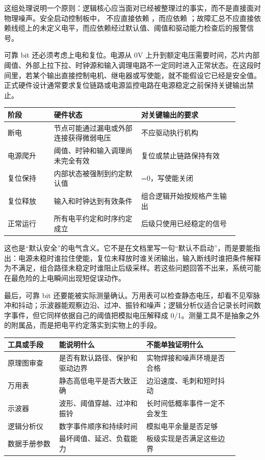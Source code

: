 这组处理说明一个原则：逻辑核心应当面对已经被整理过的事实，而不是直接面对物理噪声。安全启动控制板中， 不应直接依赖 ，而应依赖 ；故障汇总不应直接依赖线缆上的未定义电平，而应依赖经过默认值、阈值和驱动能力检查后的报警信号。

可靠 bit 还必须考虑上电和复位。电源从 0V 上升到额定电压需要时间，芯片内部阈值、外部上拉下拉、时钟源和输入调理电路不一定同时进入正常状态。在这段时间里，若某个输出直接控制电机、继电器或写使能，就不能假设它已经是安全值。正式硬件设计通常要求复位链路或电源监控电路在电源稳定之前保持关键输出禁止。

\begin{longtable}{L{0.18\linewidth}L{0.34\linewidth}L{0.38\linewidth}}
\toprule
阶段 & 硬件状态 & 对关键输出的要求 \\
\midrule
断电 & 节点可能通过漏电或外部连接获得微弱电压 & 不应驱动执行机构 \\
电源爬升 & 阈值、时钟和输入调理尚未完全有效 & 复位或禁止链路保持有效 \\
复位保持 & 内部状态被强制到约定默认值 & =0，写使能关闭 \\
复位释放 & 输入和时钟达到有效条件 & 组合逻辑开始按规格产生输出 \\
正常运行 & 所有电平约定和时序约定成立 & 后级只使用已经稳定的信号 \\
\bottomrule
\end{longtable}

这也是“默认安全”的电气含义。它不是在文档里写一句“默认不启动”，而是要能指出：电源未稳时谁拉住使能，复位未释放时谁关闭输出，输入断线时谁把条件解释为不满足，组合路径未稳定时谁阻止后级采样。若这些问题回答不出来，系统可能在最危险的上电瞬间出现短促误动作。

最后，可靠 bit 还要能被实际测量确认。万用表可以检查静态电压，却看不见窄脉冲和抖动；示波器能观察边沿、过冲、振铃和噪声；逻辑分析仪适合记录长时间数字事件，但它同样依据自己的阈值把模拟电压解释成 0/1。测量工具不是抽象之外的附属品，而是把电平约定落实到实物上的手段。

\begin{longtable}{L{0.2\linewidth}L{0.34\linewidth}L{0.36\linewidth}}
\toprule
工具或手段 & 能说明什么 & 不能单独证明什么 \\
\midrule
原理图审查 & 是否有默认路径、保护和驱动边界 & 实物焊接和噪声环境是否合格 \\
万用表 & 静态高低电平是否大致正确 & 边沿速度、毛刺和短时抖动 \\
示波器 & 波形、阈值穿越、过冲和振铃 & 长时间低概率事件一定不会发生 \\
逻辑分析仪 & 数字事件顺序和持续时间 & 模拟电平余量是否足够 \\
数据手册参数 & 最坏阈值、延迟、负载能力 & 板级实现是否满足这些边界 \\
\bottomrule
\end{longtable}

